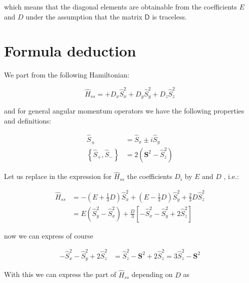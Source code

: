 \documentclass[A4paper, 12pt]{article}
\begin{document}
which means that the diagonal elements are obtainable from the coefficients $ E
$ and $ D $ under the assumption that the matrix $ \mathsf{D} $ is traceless.










\section{Formula deduction} %
\label{sec:formula_deduction}

We part from the following Hamiltonian:

\begin{equation}
  \hat{H} _{ss} =
  + D _{x} \hat S ^{2} _{x}
  + D _{y} \hat S ^{2} _{y}
  + D _{z} \hat S ^{2} _{z}
\end{equation}

and for general angular momentum operators we have the following properties and
definitions:

\begin{align}
  \hat{S} _{\pm}                               & = \hat{S} _{x} \pm i \hat{S} _{y}\\
  \left\{\hat{S} _{+} , \hat{S} _{-}  \right\} & = 2(\mathbf{S} ^{2} - \hat{S} _{z} ^{2} )
\end{align}

Let us replace in the expression for $ \hat{H} _{ss} $ the coefficients $ D
_{i}  $ by $ E $ and $ D $ , i.e.:


\begin{align*}
  \hat{H} _{ss} &=
  - \left(E + \frac{1}{3}D\right)  \hat S ^{2} _{x}
  + \left(E - \frac{1}{3}D\right)  \hat S ^{2} _{y}
  + \frac{2}{3}D \hat S ^{2} _{z} \\
  &=
  E \left( \hat{S} _{y} ^{2}  -\hat{S} _{x} ^{2}  \right)
  +
  \frac{D}{3} \left[ -\hat{S} ^{2} _{x} -\hat{S} _{y} ^{2} + 2\hat{S} _{z} ^{2}  \right]
\end{align*}

now we can express of course

\begin{align*}
  -\hat{S} ^{2} _{x} -\hat{S} _{y} ^{2} + 2\hat{S} _{z} ^{2} &=
  \hat{S} ^{2} _{z} -\mathbf S^{2} + 2\hat{S} _{z} ^{2} =
  3\hat{S} ^{2} _{z} -\mathbf S^{2}
\end{align*}

With this we can express the part of $ \hat{H} _{ss}   $ depending on $ D $ as
\end{document}
